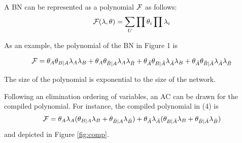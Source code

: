 \documentclass[twoside,11pt]{article}
\begin{document}
A BN can be represented as a polynomial $\cal F$ as follows:
\begin{align}
	{\cal F}(\lambda,\theta) = \sum_{U}{\prod{\theta_i}\prod{\lambda_i}}
\end{align}

As an example, the polynomial of the BN in Figure 1 is

\begin{align}
	{\cal F} = \theta_{A}\theta_{B|A}\lambda_{A}\lambda_{B} +
	  \theta_{A}\theta_{\bar{B}|A}\lambda_{A}\lambda_{\bar{B}} +
	 \theta_{\bar{A}}\theta_{B|\bar{A}}\lambda_{\bar{A}}\lambda_{B} +
	  \theta_{\bar{A}}\theta_{\bar{B}|\bar{A}}\lambda_{\bar{A}}\lambda_{\bar{B}}
\end{align}

The size of the polynomial is exponential to the size of the network.





Following an elimination ordering of variables, an AC can be drawn for the compiled polynomial.
For instance, the compiled polynomial in (4) is
\begin{eqnarray}
	{\cal F} = \theta_{A}\lambda_{A}(\theta_{B|A}\lambda_{B} + \theta_{\bar{B}|A}\lambda_{\bar{B}}) + \theta_{\bar{A}}\lambda_{\bar{A}}(\theta_{B|\bar{A}}\lambda_{B}+\theta_{\bar{B}|\bar{A}}\lambda_{\bar{B}})
\end{eqnarray}
and depicted in Figure \ref{fig:comp}.
\end{document}
